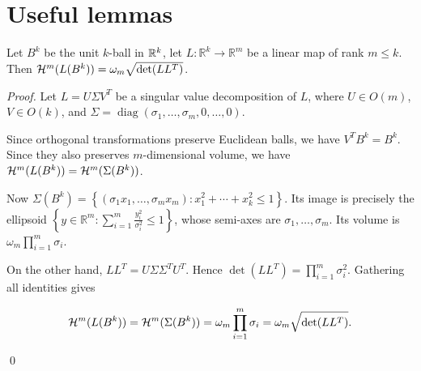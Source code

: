 \section{Useful lemmas}

\begin{lemma}\label{lem:svd}
Let $B^k$ be the unit $k$-ball in $\mathbb{R}^k$, let
$L:\mathbb{R}^k\longrightarrow\mathbb{R}^m$ be a linear map of rank
$m\le k$.  Then $\mathcal{H}^m(L(B^k)) = \omega_m \sqrt{\det(LL^T)}$.
\end{lemma}

\begin{proof}
Let $L=U\Sigma V^T$ be a singular value decomposition of $L$, where
$U\in O(m)$, $V\in O(k)$, and
$\Sigma=\operatorname{diag}(\sigma_1,\ldots,\sigma_m,0,\ldots,0)$.

Since orthogonal transformations preserve Euclidean balls, we have
$V^T B^k = B^k$. Since they also preserves $m$-dimensional volume, we
have $\mathcal{H}^m(L(B^k)) =
\mathcal{H}^m(\Sigma(B^k))$.

\begin{sloppypar}
Now $\Sigma(B^k)= \left\{ (\sigma_1x_1,\ldots,\sigma_mx_m):
x_1^2+\cdots+x_k^2\le1 \right\}$.  Its image is precisely the
ellipsoid $\left\{ y\in\mathbb{R}^m:
\sum_{i=1}^m\frac{y_i^2}{\sigma_i^2}\le1 \right\}$, whose semi-axes
are $\sigma_1,\ldots,\sigma_m$. Its volume is $\omega_m \prod_{i=1}^m
\sigma_i$.
\end{sloppypar}

On the other hand, $L L^T = U \Sigma \Sigma^T U^T$. Hence $\det(L
L^T)=\prod_{i=1}^m \sigma_i^2$.  Gathering all identities gives

\begin{minipage}[b]{0.9\textwidth}
\begin{align*}
  \mathcal{H}^m(L(B^k)) = \mathcal{H}^m(\Sigma(B^k))
  = \omega_m \prod_{i=1}^m \sigma_i = \omega_m \sqrt{\det(LL^T)}.
\end{align*}
\end{minipage}
\qed
\end{proof}


